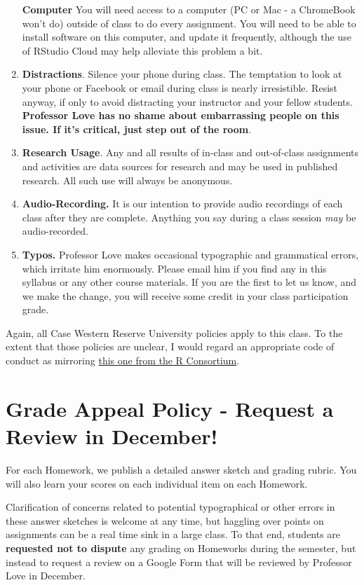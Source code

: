 \documentclass[
]{book}
\begin{document}
\begin{enumerate}
  \textbf{Computer} You will need access to a computer (PC or Mac - a ChromeBook won't do) outside of class to do every assignment. You will need to be able to install software on this computer, and update it frequently, although the use of RStudio Cloud may help alleviate this problem a bit.
\item
  \textbf{Distractions}. Silence your phone during class. The temptation to look at your phone or Facebook or email during class is nearly irresistible. Resist anyway, if only to avoid distracting your instructor and your fellow students. \textbf{Professor Love has no shame about embarrassing people on this issue. If it's critical, just step out of the room}.
\item
  \textbf{Research Usage}. Any and all results of in-class and out-of-class assignments and activities are data sources for research and may be used in published research. All such use will always be anonymous.
\item
  \textbf{Audio-Recording.} It is our intention to provide audio recordings of each class after they are complete. Anything you say during a class session \emph{may} be audio-recorded.
\item
  \textbf{Typos.} Professor Love makes occasional typographic and grammatical errors, which irritate him enormously. Please email him if you find any in this syllabus or any other course materials. If you are the first to let us know, and we make the change, you will receive some credit in your class participation grade.
\end{enumerate}

Again, all Case Western Reserve University policies apply to this class. To the extent that those policies are unclear, I would regard an appropriate code of conduct as mirroring \href{https://github.com/RConsortium/RCDI-WG/blob/master/conduct/code-of-conduct.md}{this one from the R Consortium}.

\hypertarget{grade-appeal-policy---request-a-review-in-december}{%
\section{Grade Appeal Policy - Request a Review in December!}\label{grade-appeal-policy---request-a-review-in-december}}

For each Homework, we publish a detailed answer sketch and grading rubric. You will also learn your scores on each individual item on each Homework.

Clarification of concerns related to potential typographical or other errors in these answer sketches is welcome at any time, but haggling over points on assignments can be a real time sink in a large class. To that end, students are \textbf{requested not to dispute} any grading on Homeworks during the semester, but instead to request a review on a Google Form that will be reviewed by Professor Love in December.
\end{document}
